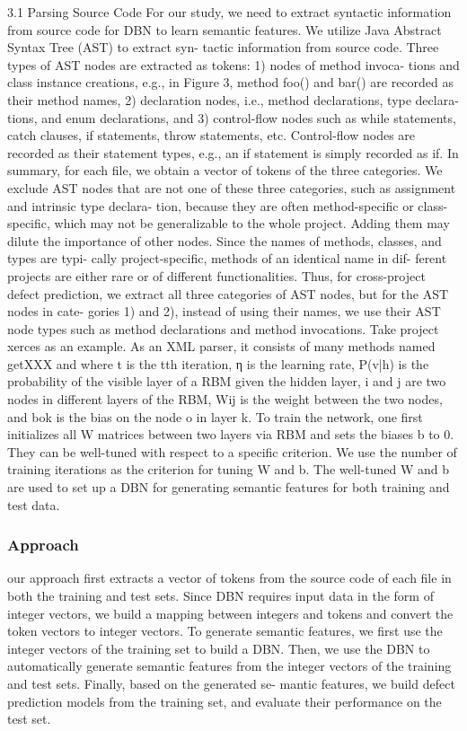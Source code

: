 \documentclass{article}
\begin{document}
3.1 Parsing Source Code
For our study, we need to extract syntactic information from source code for DBN to learn semantic features. We utilize Java Abstract Syntax Tree (AST) to extract syn- tactic information from source code. Three types of AST nodes are extracted as tokens: 1) nodes of method invoca- tions and class instance creations, e.g., in Figure 3, method foo() and bar() are recorded as their method names, 2) declaration nodes, i.e., method declarations, type declara- tions, and enum declarations, and 3) control-flow nodes such as while statements, catch clauses, if statements, throw statements, etc. Control-flow nodes are recorded as their statement types, e.g., an if statement is simply recorded as if. In summary, for each file, we obtain a vector of tokens of the three categories.
We exclude AST nodes that are not one of these three categories, such as assignment and intrinsic type declara- tion, because they are often method-specific or class-specific, which may not be generalizable to the whole project. Adding them may dilute the importance of other nodes.
Since the names of methods, classes, and types are typi- cally project-specific, methods of an identical name in dif- ferent projects are either rare or of different functionalities. Thus, for cross-project defect prediction, we extract all three categories of AST nodes, but for the AST nodes in cate- gories 1) and 2), instead of using their names, we use their AST node types such as method declarations and method invocations. Take project xerces as an example. As an XML parser, it consists of many methods named getXXX and
  where t is the tth iteration, η is the learning rate, P(v|h) is the probability of the visible layer of a RBM given the hidden layer, i and j are two nodes in different layers of the RBM, Wij is the weight between the two nodes, and bok is the bias on the node o in layer k.
To train the network, one first initializes all W matrices between two layers via RBM and sets the biases b to 0. They can be well-tuned with respect to a specific criterion. We use the number of training iterations as the criterion for tuning W and b. The well-tuned W and b are used to set up a DBN for generating semantic features for both training and test data. 
\subsubsection{Approach}
our approach first extracts a vector of tokens from the source code of each file in both the training and test sets. Since DBN requires input data in the form of integer vectors, we build a mapping between integers and tokens and convert the token vectors to integer vectors. To generate semantic features, we first use the integer vectors of the training set to build a DBN. Then, we use the DBN to automatically generate semantic features from the integer vectors of the training and test sets. Finally, based on the generated se- mantic features, we build defect prediction models from the training set, and evaluate their performance on the test set.
\end{document}
